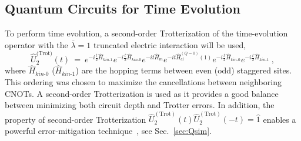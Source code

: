 \documentclass[aps, prc, tightenlines,superscriptaddress, letterpaper, amsmath, amssymb, preprintnumbers, floatfix, longbibliography, nofootinbib]{revtex4-2}
\begin{document}
\subsection{Quantum Circuits for Time Evolution }
\noindent
To perform time evolution, a second-order Trotterization of the time-evolution operator with the $\overline{\lambda}=1$ truncated electric interaction will be used,
%
\begin{equation}
\hat{U}^{\text{(Trot)}}_2(t) \ = \  e^{-i \frac{t}{2} \hat{H}_{kin\text{-1}}} e^{-i \frac{t}{2} \hat{H}_{kin\text{-0}}} e^{-i t  \hat{H}_{m}} e^{-i t \hat{H}_{el}^{(Q=0)}(1)} e^{-i \frac{t}{2} \hat{H}_{kin\text{-0}}}  e^{-i \frac{t}{2} \hat{H}_{kin\text{-1}}} \ ,
\end{equation}
%
where $\hat{H}_{kin\text{-0}}$ ($\hat{H}_{kin\text{-1}}$) are the hopping terms between even (odd) staggered sites.
This ordering was chosen to maximize the cancellations between neighboring CNOTs. 
A second-order Trotterization is used as it provides a good balance between minimizing both circuit depth and Trotter errors.
In addition, the property of second-order Trotterization $\hat{U}^{(\text{Trot})}_2(t) \hat{U}^{(\text{Trot})}_2(-t) = \hat{1}$ enables a powerful error-mitigation technique~\cite{ARahman:2022tkr}, see Sec.~\ref{sec:Qsim}.
\end{document}
